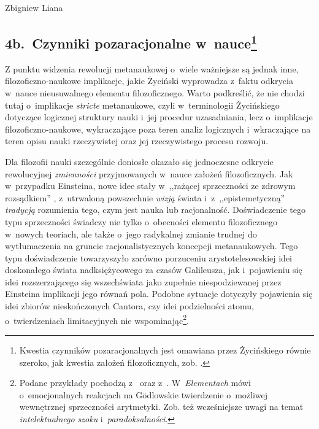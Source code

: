 \begin{artplenv}{Zbigniew Liana}
\subsection{4b.~Czynniki pozaracjonalne w~nauce\footnote{Kwestia czynników pozaracjonalnych jest omawiana przez Życińskiego równie
szeroko, jak kwestia założeń filozoficznych, zob.
\parencites[s.~127–154]{zycinski_jezyk_1983}[s.~156–166]{zycinski_teizm_1985}[rozdz. 5]%
{zycinski_structure_1988}[rozdz. 5]{zycinski_struktura_2013}%
[rozdz. 7]{zycinski_elementy_1996}.
	}
}

Z punktu widzenia rewolucji metanaukowej o~wiele ważniejsze są jednak inne, filozoficzno-naukowe implikacje, jakie
Życiński wyprowadza z~faktu odkrycia w~nauce nieusuwalnego elementu filozoficznego. Warto podkreślić, że nie chodzi
tutaj o~implikacje \textit{stricte} metanaukowe, czyli w~terminologii Życińskiego dotyczące logicznej struktury nauki i~jej
procedur uzasadniania, lecz o~implikacje filozoficzno-naukowe, wykraczające poza teren analiz
logicznych i~wkraczające na teren opisu nauki rzeczywistej oraz jej rzeczywistego procesu rozwoju. 

Dla filozofii nauki szczególnie doniosłe okazało się jednoczesne odkrycie rewolucyjnej \textit{zmienności} przyjmowanych w~nauce
założeń filozoficznych. Jak w~przypadku Einsteina, nowe idee stały w~,,rażącej sprzeczności ze zdrowym rozsądkiem''
\parencite[s.~249]{zycinski_jezyk_1983},
z~utrwaloną powszechnie \textit{wizją} świata
\parencite[s.~229]{zycinski_elementy_1996}
i~z~,,epistemetyczną'' \textit{tradycją} rozumienia tego,
czym jest nauka lub racjonalność.  Doświadczenie tego typu sprzeczności świadczy nie tylko o~obecności elementu
filozoficznego w~nowych teoriach, ale także o~jego radykalnej zmianie trudnej do wytłumaczenia na gruncie
racjonalistycznych koncepcji metanaukowych. Tego typu doświadczenie towarzyszyło zarówno porzuceniu arystotelesowskiej
idei doskonałego świata nadksiężycowego za czasów Galileusza, jak i~pojawieniu się idei rozszerzającego się
wszechświata jako zupełnie niespodziewanej przez Einsteina implikacji jego równań pola. Podobne sytuacje dotyczyły
pojawienia się idei zbiorów nieskończonych Cantora, czy idei podzielności atomu, o~twierdzeniach limitacyjnych nie
wspominając\footnote{Podane przykłady pochodzą
z~\parencite[s.~187]{zycinski_jezyk_1983}
oraz
z~\parencite[s.~247]{zycinski_elementy_1996}.
W~\textit{Elementach}
\parencite[s.~267n]{zycinski_elementy_1996}
mówi o~emocjonalnych reakcjach na Gödlowskie twierdzenie o~możliwej
wewnętrznej sprzeczności arytmetyki. Zob. też wcześniejsze uwagi na temat \textit{intelektualnego szoku} i~\textit{paradoksalności}.}.


\end{artplenv}
